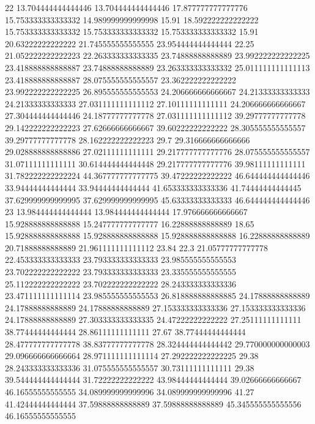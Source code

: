 22 13.704444444444446 13.704444444444446 17.877777777777776 15.753333333333332 14.989999999999998 15.91 18.592222222222222 15.753333333333332 15.753333333333332 15.753333333333332 15.91 20.63222222222222 21.745555555555555 23.954444444444444 22.25 21.052222222222223 22.263333333333335 23.74888888888889 23.992222222222225 23.418888888888887 23.74888888888889 23.263333333333332 25.011111111111113 23.418888888888887 28.075555555555557 23.362222222222222 23.992222222222225 26.895555555555553 24.206666666666667 24.21333333333333 24.21333333333333 27.031111111111112 27.10111111111111 24.206666666666667 27.304444444444446 24.18777777777778 27.031111111111112 39.29777777777778 29.142222222222223 27.62666666666667 39.60222222222222 28.305555555555557 39.29777777777778 28.162222222222223 29.7 29.316666666666666 29.028888888888886 27.02111111111111 29.217777777777776 28.075555555555557 31.07111111111111 30.614444444444448 29.217777777777776 39.98111111111111 31.782222222222224 44.367777777777775 39.47222222222222 46.644444444444446 33.94444444444444 33.94444444444444 41.653333333333336 41.74444444444445 37.629999999999995 37.629999999999995 45.63333333333333 46.644444444444446
23 13.984444444444444 13.984444444444444 17.976666666666667 15.928888888888888 15.247777777777777 16.22888888888889 18.65 15.928888888888888 15.928888888888888 15.928888888888888 16.22888888888889 20.71888888888889 21.961111111111112 23.84 22.3 21.05777777777778 22.453333333333333 23.793333333333333 23.985555555555553 23.702222222222222 23.793333333333333 23.335555555555555 25.112222222222222 23.702222222222222 28.243333333333336 23.471111111111114 23.985555555555553 26.818888888888885 24.17888888888889 24.17888888888889 24.17888888888889 27.153333333333336 27.153333333333336 24.17888888888889 27.303333333333335 24.47222222222222 27.25111111111111 38.77444444444444 28.86111111111111 27.67 38.77444444444444 28.477777777777778 38.83777777777778 28.324444444444442 29.770000000000003 29.096666666666664 28.971111111111114 27.292222222222225 29.38 28.243333333333336 31.075555555555557 30.73111111111111 29.38 39.544444444444444 31.72222222222222 43.98444444444444 39.02666666666667 46.16555555555555 34.089999999999996 34.089999999999996 41.27 41.42444444444444 37.59888888888889 37.59888888888889 45.345555555555556 46.16555555555555
